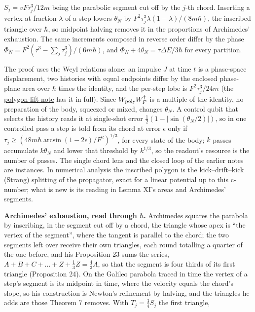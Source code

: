 \documentclass[11pt,a4paper]{article}
\begin{document}
\(S_j=vF\tau_j^3/12m\) being the parabolic segment cut off by the
\(j\)-th chord. Inserting a vertex at fraction \(\lambda\) of a step
lowers \(\theta_N\) by \(F^2\tau_j^3\lambda(1-\lambda)/(8m\hbar)\), the
inscribed triangle over \(\hbar\), so midpoint halving removes it in the
proportions of Archimedes' exhaustion. The same increments composed in
reverse order differ by the phase
\(\Phi_N=F^2(\tau^3-\sum_j\tau_j^3)/(6m\hbar)\), and
\(\Phi_N+4\theta_N=\tau\Delta E/3\hbar\) for every partition.

The proof uses the Weyl relations alone: an impulse \(J\) at time \(t\)
is a phase-space displacement, two histories with equal endpoints differ
by the enclosed phase-plane area over \(\hbar\) times the identity, and
the per-step lobe is \(F^2\tau_j^3/24m\) (the
\href{cut-measure-newton.md\#weyl-lifting-and-polygon-phases}{polygon-lift
note} has it in full). Since \(W_{\rm poly}W_F^\dagger\) is a multiple
of the identity, no preparation of the body, squeezed or mixed, changes
\(\theta_N\). A control qubit that selects the history reads it at
single-shot error \(\frac12(1-|\sin(\theta_N/2)|)\), so in one
controlled pass a step is told from its chord at error \(\epsilon\) only
if \(\tau_j\ge(48m\hbar\arcsin(1-2\epsilon)/F^2)^{1/3}\), for every
state of the body; \(k\) passes accumulate \(k\theta_N\) and lower that
threshold by \(k^{1/3}\), so the readout's resource is the number of
passes. The single chord lens and the closed loop of the earlier notes
are instances. In numerical analysis the inscribed polygon is the
kick--drift--kick (Strang) splitting of the propagator, exact for a
linear potential up to this c-number; what is new is its reading in
Lemma XI's areas and Archimedes' segments.

\textbf{Archimedes' exhaustion, read through \(\hbar\).} Archimedes
squares the parabola by inscribing, in the segment cut off by a chord,
the triangle whose apex is ``the vertex of the segment'', where the
tangent is parallel to the chord; the two segments left over receive
their own triangles, each round totalling a quarter of the one before,
and his Proposition 23 sums the series,
\(A+B+C+\dots+Z+\frac13Z=\frac43A\), so that the segment is four thirds
of its first triangle (Proposition 24). On the Galileo parabola traced
in time the vertex of a step's segment is its midpoint in time, where
the velocity equals the chord's slope, so his construction is Newton's
refinement by halving, and the triangles he adds are those Theorem 7
removes. With \(T_j=\frac34S_j\) the first triangle,
\end{document}
